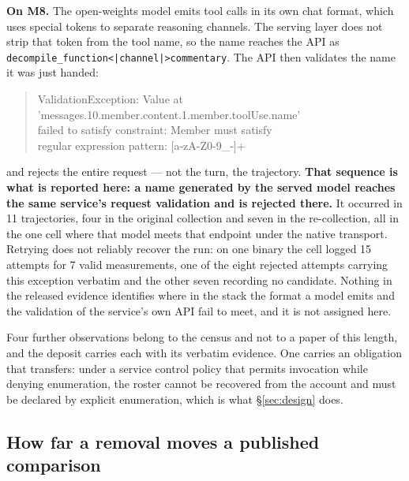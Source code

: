 \textbf{On M8.}
\label{sec:ottavo}
The open-weights model emits tool calls in its own chat format, which uses special tokens to separate
reasoning channels. The serving layer does not strip that token from the tool name, so the name reaches the
API as \texttt{decompile\_function<|channel|>commentary}. The API then validates the name it was just
handed:

\begin{quote}\footnotesize\ttfamily\raggedright
ValidationException: Value at\\
'messages.10.member.content.1.member.toolUse.name'\\
failed to satisfy constraint: Member must satisfy\\
regular expression pattern: [a-zA-Z0-9\_-]+
\end{quote}

\noindent
and rejects the entire request --- not the turn, the trajectory. \textbf{That sequence is what is reported here:
a name generated by the served model reaches the same service's request validation and is rejected there.}
It occurred in 11 trajectories, four in the original collection and seven in the re-collection, all in the
one cell where that model meets that endpoint under the native transport. Retrying does not reliably
recover the run: on one binary the cell logged 15 attempts for 7 valid measurements, one of the eight
rejected attempts carrying this exception verbatim and the other seven recording no candidate. Nothing in
the released evidence identifies where in the stack the format a model emits and the validation of the
service's own API fail to meet, and it is not assigned here.

Four further observations belong to the census and not to a paper of this length, and the deposit carries
each with its verbatim evidence. One carries an obligation that transfers: under a service control policy
that permits invocation while denying enumeration, the roster cannot be recovered from the account and must
be declared by explicit enumeration, which is what \S\ref{sec:design} does.

\subsection{How far a removal moves a published comparison}
\label{sec:bound}

